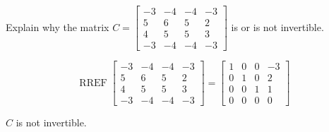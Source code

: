 
\begin{exerciseStatement}


Explain why the matrix \(C= \left[\begin{array}{cccc}
-3 & -4 & -4 & -3 \\
5 & 6 & 5 & 2 \\
4 & 5 & 5 & 3 \\
-3 & -4 & -4 & -3
\end{array}\right] \) is or is not invertible.


\end{exerciseStatement}
    
\begin{exerciseAnswer} 


\[\operatorname{RREF} \left[\begin{array}{cccc}
-3 & -4 & -4 & -3 \\
5 & 6 & 5 & 2 \\
4 & 5 & 5 & 3 \\
-3 & -4 & -4 & -3
\end{array}\right] = \left[\begin{array}{cccc}
1 & 0 & 0 & -3 \\
0 & 1 & 0 & 2 \\
0 & 0 & 1 & 1 \\
0 & 0 & 0 & 0
\end{array}\right] \]

\(C\) is not invertible.
\end{exerciseAnswer}
    
